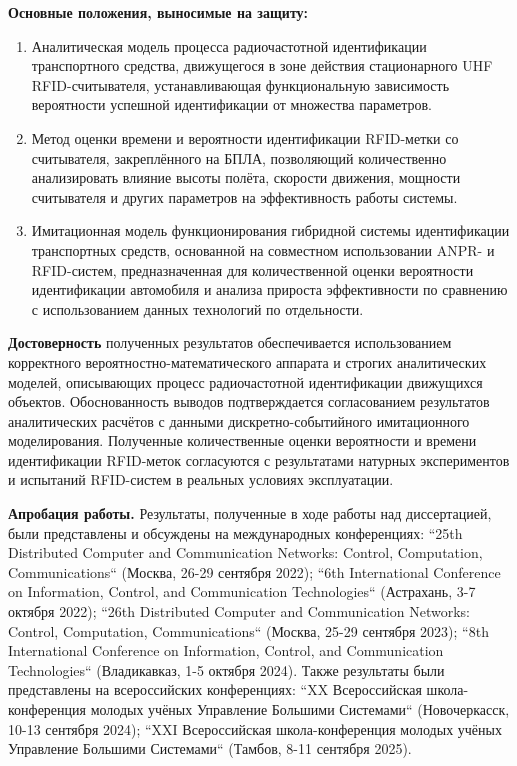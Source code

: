 \documentclass[12pt]{article}
\theoremstyle{definition}
\begin{document}
\textbf{Основные положения, выносимые на защиту:}

\begin{enumerate}
    \item Аналитическая модель процесса радиочастотной идентификации транспортного средства, движущегося в зоне действия стационарного UHF RFID-считывателя, устанавливающая функциональную зависимость вероятности успешной идентификации от множества параметров.
    \item Метод оценки времени и вероятности идентификации RFID-метки со считывателя, закреплённого на БПЛА, позволяющий количественно анализировать влияние высоты полёта, скорости движения, мощности считывателя и других параметров на эффективность работы системы.
    \item Имитационная модель функционирования гибридной системы идентификации транспортных средств, основанной на совместном использовании ANPR- и RFID-систем, предназначенная для количественной оценки вероятности идентификации автомобиля и анализа прироста эффективности по сравнению с использованием данных технологий по отдельности.
\end{enumerate}

\textbf{Достоверность} полученных результатов обеспечивается использованием корректного вероятностно-математического аппарата и строгих аналитических моделей, описывающих процесс радиочастотной идентификации движущихся объектов. Обоснованность выводов подтверждается согласованием результатов аналитических расчётов с данными дискретно-событийного имитационного моделирования. Полученные количественные оценки вероятности и времени идентификации RFID-меток согласуются с результатами натурных экспериментов и испытаний RFID-систем в реальных условиях эксплуатации.

\textbf{Апробация работы.} Результаты, полученные в ходе работы над диссертацией, были представлены и обсуждены на международных конференциях: ``25th Distributed Computer and Communication Networks: Control, Computation, Communications`` (Москва, 26-29 сентября 2022); ``6th International Conference on Information, Control, and Communication Technologies`` (Астрахань, 3-7 октября 2022); ``26th Distributed Computer and Communication Networks: Control, Computation, Communications`` (Москва, 25-29 сентября 2023); ``8th International Conference on Information, Control, and Communication Technologies`` (Владикавказ, 1-5 октября 2024). Также результаты были представлены на всероссийских конференциях: ``XX Всероссийская школа-конференция молодых учёных Управление Большими Системами`` (Новочеркасск, 10-13 сентября 2024); ``XXI Всероссийская школа-конференция молодых учёных Управление Большими Системами`` (Тамбов, 8-11 сентября 2025).
\end{document}
